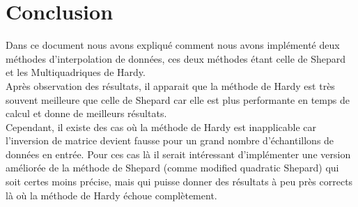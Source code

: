 \documentclass[a4paper,9pt]{article}
\begin{document}
\section{Conclusion}
\label{sec:conclusion}
Dans ce document nous avons expliqué comment nous avons implémenté deux méthodes d'interpolation de données, ces deux méthodes étant celle de Shepard et les Multiquadriques de Hardy.\\Après observation des résultats, il apparait que la méthode de Hardy est très souvent meilleure que celle de Shepard car elle est plus performante en temps de calcul et donne de meilleurs résultats.\\Cependant, il existe des cas où la méthode de Hardy est inapplicable car l'inversion de matrice devient fausse pour un grand nombre d'échantillons de données en entrée. Pour ces cas là il serait intéressant d'implémenter une version améliorée de la méthode de Shepard (comme modified quadratic Shepard) qui soit certes moins précise, mais qui puisse donner des résultats à peu près corrects là où la méthode de Hardy échoue complètement.
\end{document}
